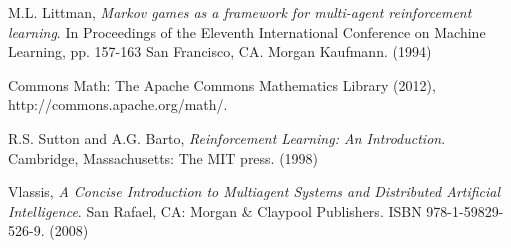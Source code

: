 \newpage
\nocite{*}


\begin{thebibliography}{9}

  M.L. Littman,
  \emph{Markov games as a framework for multi-agent reinforcement learning}. In Proceedings of the Eleventh International Conference on Machine Learning, pp. 157-163 San Francisco, CA. Morgan Kaufmann. (1994)
 
Commons Math: The Apache Commons Mathematics Library (2012),\\ http://commons.apache.org/math/. 

R.S. Sutton and A.G. Barto,
\emph{Reinforcement Learning: An Introduction}. 
Cambridge, Massachusetts: The MIT press. (1998) 

Vlassis,
\emph{A Concise Introduction to Multiagent Systems and Distributed Artificial Intelligence}. San Rafael, CA: Morgan \& Claypool Publishers. ISBN 978-1-59829-526-9. (2008)

\end{thebibliography}
